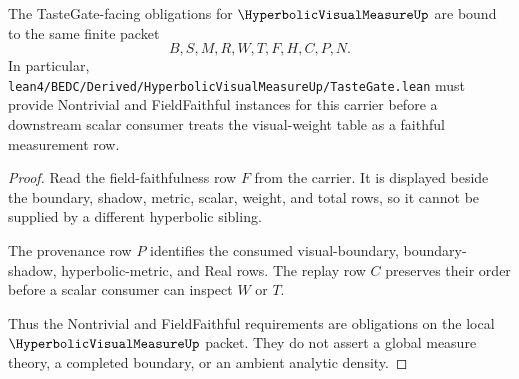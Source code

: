 \begin{theorem}
\label{thm:hyperbolic-visual-measure-tastegate-route}
The TasteGate-facing obligations for $\HyperbolicVisualMeasureUp$ are bound to the same finite packet
$$
B,S,M,R,W,T,F,H,C,P,N .
$$
In particular, \texttt{lean4/BEDC/Derived/HyperbolicVisualMeasureUp/TasteGate.lean} must provide Nontrivial and FieldFaithful instances for this carrier before a downstream scalar consumer treats the visual-weight table as a faithful measurement row.
\end{theorem}
\begin{proof}
Read the field-faithfulness row $F$ from the carrier. It is displayed beside the boundary, shadow, metric, scalar, weight, and total rows, so it cannot be supplied by a different hyperbolic sibling.

The provenance row $P$ identifies the consumed visual-boundary, boundary-shadow, hyperbolic-metric, and Real rows. The replay row $C$ preserves their order before a scalar consumer can inspect $W$ or $T$.

Thus the Nontrivial and FieldFaithful requirements are obligations on the local $\HyperbolicVisualMeasureUp$ packet. They do not assert a global measure theory, a completed boundary, or an ambient analytic density.
\end{proof}




